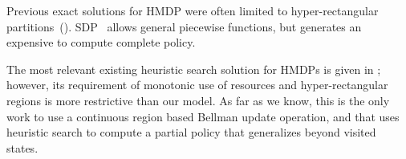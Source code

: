 Previous exact solutions for HMDP were often limited to hyper-rectangular partitions~(\cite{feng04,li05}). SDP~\cite{sanner11,zamani12} allows general piecewise functions, but generates an expensive to compute complete policy.

The most relevant existing heuristic search solution for HMDPs is given in \cite{meuleau09HAO}; however, its requirement of monotonic use of resources and hyper-rectangular regions is more restrictive than our model. As far as we know, this is the only work to use a continuous region based Bellman update operation, and that uses heuristic search to compute a partial policy that generalizes beyond visited states.